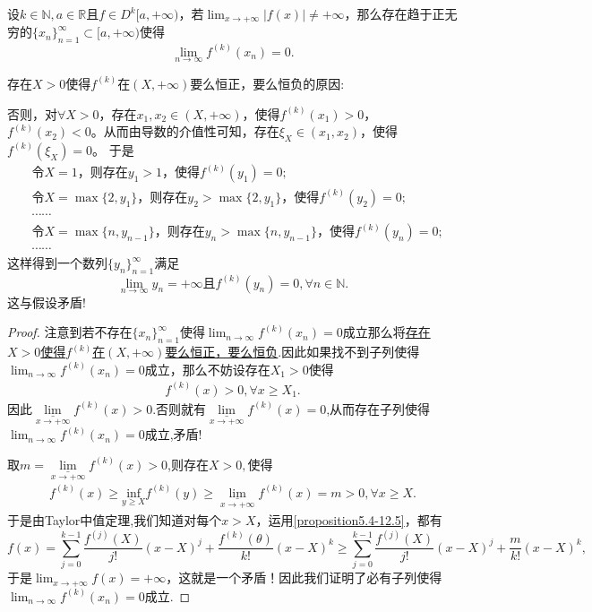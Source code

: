 \documentclass[../../main.tex]{subfiles}%
\begin{document}
\begin{proposition}\label{proposition:函数不爆破则各阶导数必然有趋于 0 的子列}
设\(k\in\mathbb{N},a\in\mathbb{R}\)且\(f\in D^{k}[a,+\infty)\)，若\(\lim_{x\rightarrow +\infty}|f(x)|\neq +\infty\)，那么存在趋于正无穷的\(\{x_n\}_{n = 1}^{\infty}\subset [a,+\infty)\)使得
\[
\lim_{n\rightarrow\infty}f^{(k)}(x_n)=0.
\]
\end{proposition}
\begin{note}
\hypertarget{proposition5.4由假设得到这个结论的原因}{存在\(X > 0\)使得\(f^{(k)}\)在\((X,+\infty)\)要么恒正，要么恒负的原因:}否则，对\(\forall X>0\)，存在\(x_1,x_2\in (X,+\infty)\)，使得\(f^{(k)}(x_1)>0\)，\(f^{(k)}(x_2)<0\)。从而由导数的介值性可知，存在\(\xi_X\in (x_1,x_2)\)，使得\(f^{(k)}(\xi_X) = 0\)。
于是
\begin{align*}
&\text{令}X = 1\text{，则存在}y_1>1\text{，使得}f^{(k)}(y_1)=0;\\
&\text{令}X=\max\{2,y_1\}\text{，则存在}y_2>\max\{2,y_1\}\text{，使得}f^{(k)}(y_2)=0;\\
&\cdots\cdots\\
&\text{令}X=\max\{n,y_{n - 1}\}\text{，则存在}y_n>\max\{n,y_{n - 1}\}\text{，使得}f^{(k)}(y_n)=0;\\
&\cdots\cdots
\end{align*}
这样得到一个数列\(\{y_n\}_{n = 1}^{\infty}\)满足
\[
\lim_{n\rightarrow \infty}y_n=+\infty\text{且}f^{(k)}(y_n)=0,\forall n\in \mathbb{N}.
\]
这与假设矛盾!
\end{note}
\begin{proof}
注意到若不存在\(\{x_n\}_{n = 1}^{\infty}\)使得\(\lim_{n\rightarrow\infty}f^{(k)}(x_n)=0\)成立那么将\hyperlink{proposition5.4由假设得到这个结论的原因}{存在\(X > 0\)使得\(f^{(k)}\)在\((X,+\infty)\)要么恒正，要么恒负}.因此如果找不到子列使得\(\lim_{n\rightarrow\infty}f^{(k)}(x_n)=0\)成立，那么不妨设存在\(X_1> 0\)使得
\begin{align*}
f^{(k)}(x)>0,\forall x\geqslant X_1.
\end{align*}
因此$\underset{x\rightarrow +\infty}{\underline{\lim }}f^{(k)}\left( x \right) >0.$否则就有$\underset{x\rightarrow +\infty}{\underline{\lim }}f^{(k)}\left( x \right) =0$,从而存在子列使得\(\lim_{n\rightarrow\infty}f^{(k)}(x_n)=0\)成立,矛盾!

取$m=\underset{x\rightarrow +\infty}{\underline{\lim }}f^{(k)}\left( x \right) >0$,则存在$X>0,$使得
\begin{align}\label{proposition5.4-12.5}
f^{(k)}(x)\geqslant \underset{y\geqslant X}{\mathrm{inf}}f^{(k)}\left( y \right) \geqslant \underset{x\rightarrow +\infty}{\underline{\lim }}f^{(k)}\left( x \right) =m>0,\forall x\geqslant X.
\end{align}
于是由Taylor中值定理,我们知道对每个\(x > X\)，运用\eqref{proposition5.4-12.5}，都有
\[f(x)=\sum_{j = 0}^{k - 1}\frac{f^{(j)}(X)}{j!}(x - X)^j+\frac{f^{(k)}(\theta)}{k!}(x - X)^k\geqslant\sum_{j = 0}^{k - 1}\frac{f^{(j)}(X)}{j!}(x - X)^j+\frac{m}{k!}(x - X)^k,\]
于是\(\lim_{x\rightarrow +\infty}f(x)=+\infty\)，这就是一个矛盾！因此我们证明了必有子列使得\(\lim_{n\rightarrow\infty}f^{(k)}(x_n)=0\)成立.
\end{proof}
\end{document}
